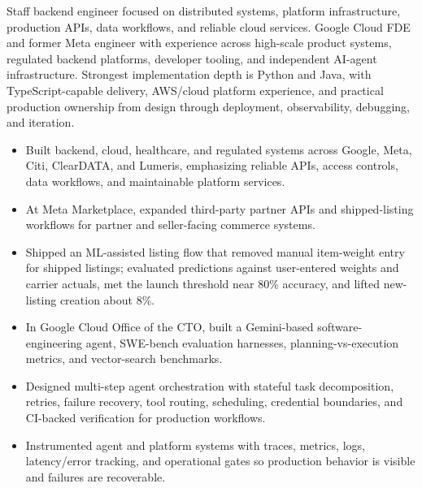 


Staff backend engineer focused on distributed systems, platform infrastructure, production APIs, data workflows, and reliable cloud services. Google Cloud FDE and former Meta engineer with experience across high-scale product systems, regulated backend platforms, developer tooling, and independent AI-agent infrastructure. Strongest implementation depth is Python and Java, with TypeScript-capable delivery, AWS/cloud platform experience, and practical production ownership from design through deployment, observability, debugging, and iteration.
\begin{itemize}
  \item Built backend, cloud, healthcare, and regulated systems across Google, Meta, Citi, ClearDATA, and Lumeris, emphasizing reliable APIs, access controls, data workflows, and maintainable platform services.
  \item At Meta Marketplace, expanded third-party partner APIs and shipped-listing workflows for partner and seller-facing commerce systems.
  \item Shipped an ML-assisted listing flow that removed manual item-weight entry for shipped listings; evaluated predictions against user-entered weights and carrier actuals, met the launch threshold near 80\% accuracy, and lifted new-listing creation about 8\%.
\end{itemize}
\begin{itemize}
  \item In Google Cloud Office of the CTO, built a Gemini-based software-engineering agent, SWE-bench evaluation harnesses, planning-vs-execution metrics, and vector-search benchmarks.
  \item Designed multi-step agent orchestration with stateful task decomposition, retries, failure recovery, tool routing, scheduling, credential boundaries, and CI-backed verification for production workflows.
  \item Instrumented agent and platform systems with traces, metrics, logs, latency/error tracking, and operational gates so production behavior is visible and failures are recoverable.
\end{itemize}




